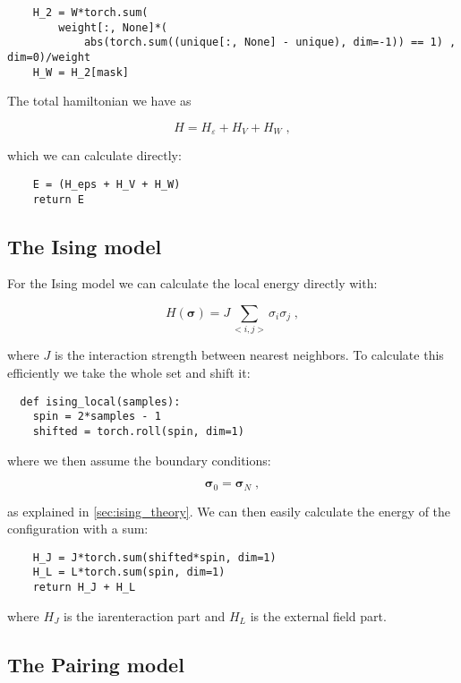 \begin{verbatim} 
    H_2 = W*torch.sum(
        weight[:, None]*(
            abs(torch.sum((unique[:, None] - unique), dim=-1)) == 1) , dim=0)/weight
    H_W = H_2[mask]
\end{verbatim}

The total hamiltonian we have as

\[
  H = H_{\varepsilon} + H_V + H_W \; ,
\]

which we can calculate directly:

\begin{verbatim} 
    E = (H_eps + H_V + H_W)
    return E
\end{verbatim}


\subsection{The Ising model}

For the Ising model we can calculate the local energy directly with:

\begin{equation}
  H(\boldsymbol{\sigma}) = J\sum_{<i,j>}\sigma_i\sigma_j \; ,
  \label{eq:imp_hamil_ising}
\end{equation}

where $J$ is the interaction strength between nearest neighbors. To calculate this efficiently we take the whole set and shift it:

\begin{verbatim}
  def ising_local(samples):
    spin = 2*samples - 1
    shifted = torch.roll(spin, dim=1)
\end{verbatim}

where we then assume the boundary conditions:

\begin{equation}
  \mathbf{\sigma}_0 = \mathbf{\sigma}_N \; ,
  \label{eq:ising_boundary_imp}
\end{equation}

as explained in \ref{sec:ising_theory}. We can then easily calculate the energy of the configuration with a sum:

\begin{verbatim}
    H_J = J*torch.sum(shifted*spin, dim=1)
    H_L = L*torch.sum(spin, dim=1)
    return H_J + H_L
\end{verbatim}

where $H_J$ is the iarenteraction part and $H_L$ is the external field part.

\subsection{The Pairing model}

